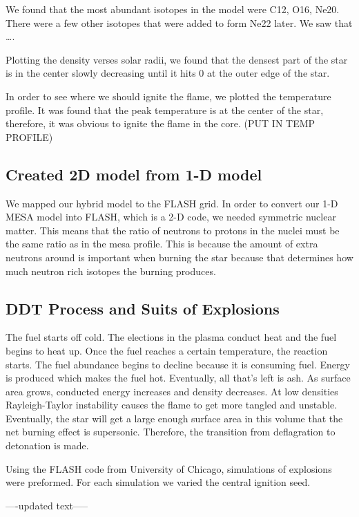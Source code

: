 \documentclass[iop,apj]{emulateapj}
\begin{document}
We found that the most abundant isotopes in the model were C12, O16,
Ne20. There were a few other isotopes that were added to form Ne22
later. We saw that  ….

Plotting the density verses solar radii, we found that the densest part
of the star is in the center slowly decreasing until it hits 0 at the
outer edge of the star.

In order to see where we should ignite the flame, we plotted the
temperature profile. It was found that the peak temperature is at the
center of the star, therefore, it was obvious to ignite the flame in
the core. (PUT IN TEMP PROFILE)

\subsection{Created 2D model from 1-D model}

We mapped our hybrid model to the FLASH grid. In order to convert our 1-D
MESA model into FLASH, which is a 2-D code, we needed symmetric nuclear
matter. This means that the ratio of neutrons to protons in the nuclei
must be the same ratio as in the mesa profile. This is because the amount
of extra neutrons around is important when burning the star because that
determines how much neutron rich isotopes the burning produces.


\subsection{DDT Process and Suits of Explosions}

The fuel starts off cold. The elections in the plasma conduct heat and the
fuel begins to heat up. Once the fuel reaches a certain temperature, the
reaction starts. The fuel abundance begins to decline because it is consuming
fuel. Energy is produced which makes the fuel hot. Eventually, all that’s
left is ash. As surface area grows, conducted energy increases and density
decreases. At low densities Rayleigh-Taylor instability causes the flame to
get more tangled and unstable. Eventually, the star will get a large enough
surface area in this volume that the net burning effect is supersonic.
Therefore, the transition from deflagration to detonation is made. 

Using the FLASH code from University of Chicago, simulations of
explosions were preformed. For each simulation we varied the central
ignition seed. 

----updated text-----
\end{document}
